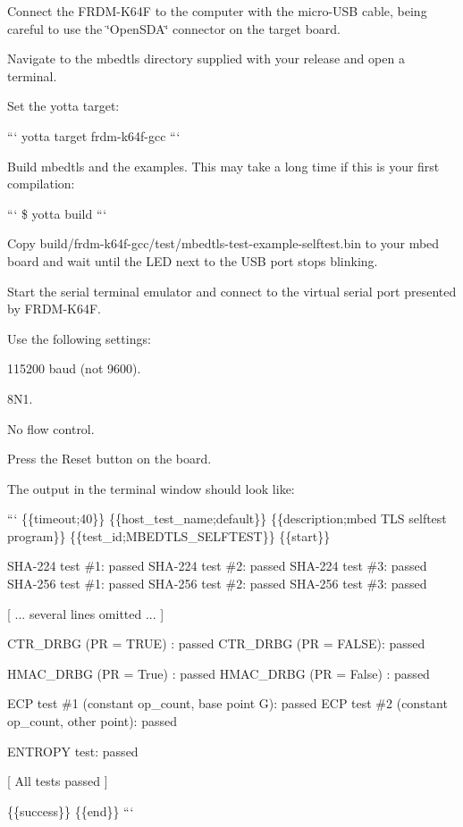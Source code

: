 \begin{DoxyEnumerate}
\item Connect the F\-R\-D\-M-\/\-K64\-F to the computer with the micro-\/\-U\-S\-B cable, being careful to use the \char`\"{}\-Open\-S\-D\-A\char`\"{} connector on the target board.
\item Navigate to the mbedtls directory supplied with your release and open a terminal.
\item Set the yotta target\-:

``` yotta target frdm-\/k64f-\/gcc ```
\item Build mbedtls and the examples. This may take a long time if this is your first compilation\-:

``` \$ yotta build ```
\item Copy {\ttfamily build/frdm-\/k64f-\/gcc/test/mbedtls-\/test-\/example-\/selftest.\-bin} to your mbed board and wait until the L\-E\-D next to the U\-S\-B port stops blinking.
\item Start the serial terminal emulator and connect to the virtual serial port presented by F\-R\-D\-M-\/\-K64\-F.

Use the following settings\-:
\begin{DoxyItemize}
\item 115200 baud (not 9600).
\item 8\-N1.
\item No flow control.
\end{DoxyItemize}
\item Press the Reset button on the board.
\item The output in the terminal window should look like\-:

``` \{\{timeout;40\}\} \{\{host\-\_\-test\-\_\-name;default\}\} \{\{description;mbed T\-L\-S selftest program\}\} \{\{test\-\_\-id;M\-B\-E\-D\-T\-L\-S\-\_\-\-S\-E\-L\-F\-T\-E\-S\-T\}\} \{\{start\}\}

S\-H\-A-\/224 test \#1\-: passed S\-H\-A-\/224 test \#2\-: passed S\-H\-A-\/224 test \#3\-: passed S\-H\-A-\/256 test \#1\-: passed S\-H\-A-\/256 test \#2\-: passed S\-H\-A-\/256 test \#3\-: passed

\mbox{[} ... several lines omitted ... \mbox{]}

C\-T\-R\-\_\-\-D\-R\-B\-G (P\-R = T\-R\-U\-E) \-: passed C\-T\-R\-\_\-\-D\-R\-B\-G (P\-R = F\-A\-L\-S\-E)\-: passed

H\-M\-A\-C\-\_\-\-D\-R\-B\-G (P\-R = True) \-: passed H\-M\-A\-C\-\_\-\-D\-R\-B\-G (P\-R = False) \-: passed

E\-C\-P test \#1 (constant op\-\_\-count, base point G)\-: passed E\-C\-P test \#2 (constant op\-\_\-count, other point)\-: passed

E\-N\-T\-R\-O\-P\-Y test\-: passed

\mbox{[} All tests passed \mbox{]}

\{\{success\}\} \{\{end\}\} ``` 
\end{DoxyEnumerate}